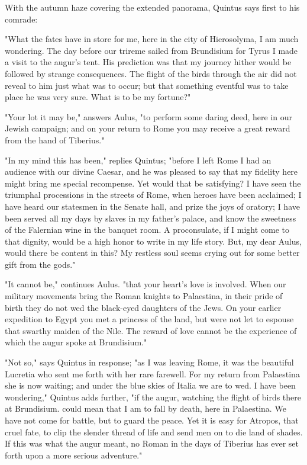 With the autumn haze covering the extended panorama, Quintus says
first to his comrade:

"What the fates have in store for me, here in the city of
Hierosolyma, I am much wondering.  The day before our trireme
sailed from Brundisium for Tyrus I made a visit to the augur's
tent.  His prediction was that my journey hither would be followed
by strange consequences.  The flight of the birds through the air
did not reveal to him just what was to occur; but that something
eventful was to take place he was very sure.  What is to be my
fortune?"

"Your lot it may be," answers Aulus, "to perform some daring deed,
here in our Jewish campaign; and on your return to Rome you may
receive a great reward from the hand of Tiberius."

"In my mind this has been," replies Quintus; "before I left Rome I
had an audience with our divine Caesar, and he was pleased to say
that my fidelity here might bring me special recompense.  Yet would
that be satisfying?  I have seen the triumphal processions in the
streets of Rome, when heroes have been acclaimed; I have heard our
statesmen in the Senate hall, and prize the joys of oratory; I have
been served all my days by slaves in my father's palace, and know
the sweetness of the Falernian wine in the banquet room.  A
proconsulate, if I might come to that dignity, would be a high
honor to write in my life story.  But, my dear Aulus, would there
be content in this?  My restless soul seems crying out for some
better gift from the gods."

"It cannot be," continues Aulus.  "that your heart's love is
involved.  When our military movements bring the Roman knights to
Palaestina, in their pride of birth they do not wed the black-eyed
daughters of the Jews.  On your earlier expedition to Egypt you met
a princess of the land, but were not let to espouse that swarthy
maiden of the Nile.  The reward of love cannot be the experience of
which the augur spoke at Brundisium."

"Not so," says Quintus in response; "as I was leaving Rome, it was
the beautiful Lucretia who sent me forth with her rare farewell.
For my return from Palaestina she is now waiting; and under the
blue skies of Italia we are to wed.  I have been wondering,"
Quintus adds further, "if the augur, watching the flight of birds
there at Brundisium.  could mean that I am to fall by death, here
in Palaestina.  We have not come for battle, but to guard the
peace.  Yet it is easy for Atropos, that cruel fate, to clip the
slender thread of life and send men on to die land of shades.  If
this was what the augur meant, no Roman in the days of Tiberius has
ever set forth upon a more serious adventure."

